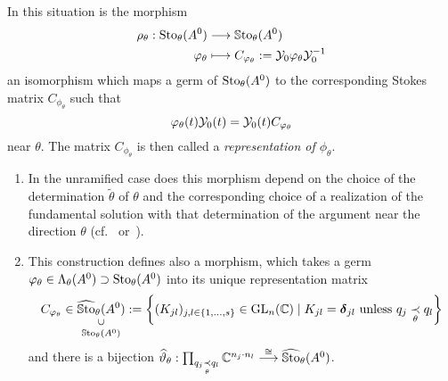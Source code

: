 \begin{prop}\label{prop:representation}
  In this situation is the morphism
  \begin{align*}
    \rho_{\theta}:\operatorname{Sto}_\theta(A^0)&\longrightarrow\operatorname{\mathbb{S}to}_\theta(A^0)
    \\\varphi_\theta
    &\longmapsto
    C_{\varphi_\theta}:=\mathcal{Y}_{0}\varphi_\theta\mathcal{Y}_{0}^{-1}
  \end{align*}
  an isomorphism which maps a germ of $\operatorname{Sto}_\theta(A^0)$ to the corresponding
  Stokes matrix $C_{\phi_\theta}$ such that
  \begin{equation} \label{eq:representation}
    \varphi_\theta(t)\mathcal{Y}_{0}(t)
    =\mathcal{Y}_{0}(t)C_{\varphi_\theta}
  \end{equation}
  near $\theta$.
  The matrix $C_{\phi_\theta}$ is then called a \emph{representation of
  $\phi_\theta$}.
  \begin{s-rem}
    \begin{enumerate}
      \item In the unramified case does this morphism depend on the choice of
        the determination $\tilde\theta$ of $\theta$ and the corresponding
        choice of a realization of the fundamental solution with that
        determination of the argument near the direction $\theta$
        (cf.~\cite{Loday1994} or~\cite[78f]{Loday2014}).
      \item {}
        This construction defines also a morphism, which takes a germ
        $\varphi_\theta\in\Lambda_\theta(A^0)\supset\operatorname{Sto}_\theta(A^0)$ into its
        unique representation matrix
        \[
          C_{\phi_\theta} \in
          \underset{\SSto_\theta(A^0)}{%
            \underset{\text{\rotatebox[origin=c]{90}{$\subset$}}}{%
              \hat\SSto_{\theta}(A^0)}}
          :=
          \left\{(K_{jl})_{j,l\in\{1,\dots,s\}}
            \in \GL_n(\C)\mid K_{jl}=\bdelta_{jl} \text{ unless }
            q_j \underset{\theta}{\prec} q_l \right\}
        \]
        and there is a bijection $\widehat\vartheta_\theta:
        \prod_{q_j\underset{\theta}{\prec}q_l}\mathbb{C}^{n_j \cdot n_l}
        \overset{\cong}{\longrightarrow} \widehat{\operatorname{\mathbb{S}to}}_\theta(A^0)$.
        \begin{comment}
          Does this define a local-constant sheaf
          \[
            I\mapsto \hat\SSto_{I}(A^0)
            :=
            \left\{(K_{jl})_{j,l\in\{1,\dots,s\}}
              \in \GL_n(\C)\mid K_{jl}=\bdelta_{jl} \text{ unless }
              q_j \underset{\theta}{\prec} q_l
              \text{ for some } \theta\in I\right\}
          \]
          and a skyscreaper sheaf
          \[
            I\mapsto \SSto_{I}(A^0) \,.
          \]
          \PROBLEM
        \end{comment}
    \end{enumerate}
  \end{s-rem}
\end{prop}
